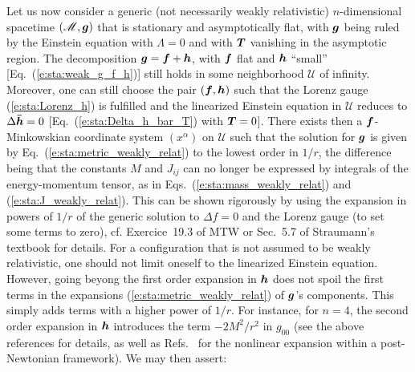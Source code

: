 Let us now consider a generic (not necessarily weakly relativistic) $n$-dimensional spacetime
$(\mathscr{M},\bm{g})$ that is stationary and asymptotically flat, with $\bm{g}$
being ruled by the Einstein equation with $\Lambda=0$ and with $\bm{T}$ vanishing in the
asymptotic region.
The decomposition $\bm{g} = \bm{f} + \bm{h}$, with $\bm{f}$ flat and $\bm{h}$ ``small''
[Eq.~(\ref{e:sta:weak_g_f_h})] still holds in some neighborhood $\mathscr{U}$ of infinity.
Moreover, one can still choose the pair $(\bm{f},\bm{h})$ such that
the Lorenz gauge (\ref{e:sta:Lorenz_h}) is fulfilled and
the linearized Einstein equation in $\mathscr{U}$ reduces to $\Delta \bm{\bar{h}} = 0$
[Eq.~(\ref{e:sta:Delta_h_bar_T}) with $\bm{T} = 0$].
There exists then a $\bm{f}$-Minkowskian coordinate system $(x^\alpha)$ on $\mathscr{U}$
such that the solution for $\bm{g}$ is given
by Eq.~(\ref{e:sta:metric_weakly_relat}) to the lowest order in $1/r$,
the difference being that the constants
$M$ and $J_{ij}$ can no longer be expressed by integrals of the energy-momentum
tensor, as in Eqs.~(\ref{e:sta:mass_weakly_relat}) and (\ref{e:sta:J_weakly_relat}).
This can be shown rigorously by using the expansion in powers of $1/r$ of
the generic solution to $\Delta f = 0$ and the Lorenz
gauge (to set some terms to zero), cf. Exercice~19.3 of MTW \cite{MisneTW73}
or Sec.~5.7 of Straumann's textbook \cite{Strau13} for details.
For a configuration that is not assumed to be weakly relativistic, one
should not limit oneself to the linearized Einstein equation.
However, going beyong the first order expansion in $\bm{h}$
does not spoil the first terms in the expansions (\ref{e:sta:metric_weakly_relat}) of
$\bm{g}$'s components. This simply adds terms with a higher power
of $1/r$. For instance, for $n=4$, the second order expansion in $\bm{h}$ introduces
the term $-2M^2/r^2$ in $g_{00}$ (see the above references for details, as well
as Refs.~\cite{Blanc24,PoissW14} for the nonlinear expansion within a post-Newtonian framework).
We may then assert:


